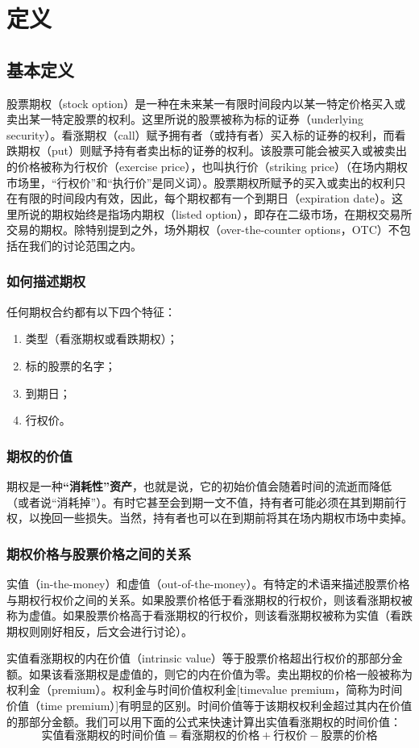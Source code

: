 \chapter{定义\label{ch01}}
\section{基本定义}
股票期权（stock option）是一种在未来某一有限时间段内以某一特定价格买入或卖出某一特定股票的权利。这里所说的股票被称为标的证券（underlying security）。看涨期权（call）赋予拥有者（或持有者）买入标的证券的权利，而看跌期权（put）则赋予持有者卖出标的证券的权利。该股票可能会被买入或被卖出的价格被称为行权价（exercise price），也叫执行价（striking price）（在场内期权市场里，“行权价”和“执行价”是同义词）。股票期权所赋予的买入或卖出的权利只在有限的时间段内有效，因此，每个期权都有一个到期日（expiration date）。这里所说的期权始终是指场内期权（listed option），即存在二级市场，在期权交易所交易的期权。除特别提到之外，场外期权（over-the-counter options，OTC）不包括在我们的讨论范围之内。
\subsection{如何描述期权}
任何期权合约都有以下四个特征：
\begin{enumerate}
    \item 类型（看涨期权或看跌期权）；
    \item 标的股票的名字；
    \item 到期日；
    \item 行权价。
\end{enumerate}
\subsection{期权的价值}
期权是一种\textbf{“消耗性”资产}，也就是说，它的初始价值会随着时间的流逝而降低（或者说“消耗掉”）。有时它甚至会到期一文不值，持有者可能必须在其到期前行权，以挽回一些损失。当然，持有者也可以在到期前将其在场内期权市场中卖掉。
\subsection{期权价格与股票价格之间的关系}
实值（in-the-money）和虚值（out-of-the-money）。有特定的术语来描述股票价格与期权行权价之间的关系。如果股票价格低于看涨期权的行权价，则该看涨期权被称为虚值。如果股票价格高于看涨期权的行权价，则该看涨期权被称为实值（看跌期权则刚好相反，后文会进行讨论）。

实值看涨期权的内在价值（intrinsic value）等于股票价格超出行权价的那部分金额。如果该看涨期权是虚值的，则它的内在价值为零。卖出期权的价格一般被称为权利金（premium）。权利金与时间价值权利金[timevalue premium，简称为时间价值（time premium）]有明显的区别。时间价值等于该期权权利金超过其内在价值的那部分金额。我们可以用下面的公式来快速计算出实值看涨期权的时间价值：
$$\text{实值看涨期权的时间价值}=\text{看涨期权的价格}+\text{行权价}-\text{股票的价格}$$

